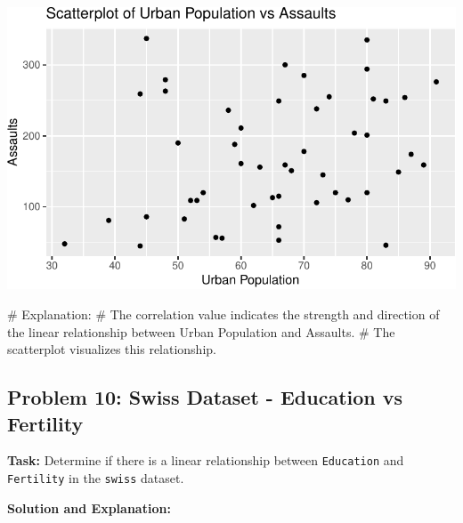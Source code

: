 \documentclass[
  letterpaper,
  DIV=11,
  numbers=noendperiod]{scrreprt}
\newenvironment{Shaded}{\begin{snugshade}}{\end{snugshade}}
\newcommand{\CommentTok}[1]{\textcolor[rgb]{0.37,0.37,0.37}{#1}}
\newcommand{\FunctionTok}[1]{\textcolor[rgb]{0.28,0.35,0.67}{#1}}
\newcommand{\NormalTok}[1]{\textcolor[rgb]{0.00,0.23,0.31}{#1}}
\newcommand{\OtherTok}[1]{\textcolor[rgb]{0.00,0.23,0.31}{#1}}
\newcommand{\SpecialCharTok}[1]{\textcolor[rgb]{0.37,0.37,0.37}{#1}}
\begin{document}
\includegraphics{Scatterplots_and_Correlation_files/figure-pdf/unnamed-chunk-14-1.pdf}

\begin{Shaded}
\begin{Highlighting}[]
\CommentTok{\# Explanation:}
\CommentTok{\# The correlation value indicates the strength and direction of the linear relationship between Urban Population and Assaults.}
\CommentTok{\# The scatterplot visualizes this relationship.}
\end{Highlighting}
\end{Shaded}

\subsection*{Problem 10: Swiss Dataset - Education vs
Fertility}\label{problem-10-swiss-dataset---education-vs-fertility}

\textbf{Task:} Determine if there is a linear relationship between
\texttt{Education} and \texttt{Fertility} in the \texttt{swiss} dataset.

\textbf{Solution and Explanation:}

\begin{Shaded}
\end{Shaded}
\end{document}
